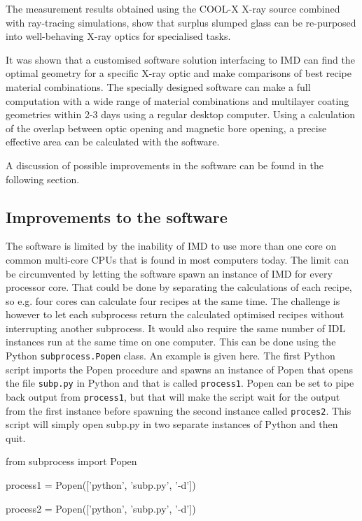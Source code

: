 The measurement results obtained using the COOL-X X-ray source combined with ray-tracing simulations, show that surplus slumped glass can be re-purposed into well-behaving X-ray optics for specialised tasks.

It was shown that a customised software solution interfacing to IMD can find the optimal geometry for a specific X-ray optic and make comparisons of best recipe material combinations. The specially designed software can make a full computation with a wide range of material combinations and multilayer coating geometries within 2-3 days using a regular desktop computer. Using a calculation of the overlap between optic opening and magnetic bore opening, a precise effective area can be calculated with the software.

A discussion of possible improvements in the software can be found in the following section.

\subsection{Improvements to the software}\label{sec:software_improvements}
The software is limited by the inability of IMD to use more than one core on common multi-core CPUs that is found in most computers today. The limit can be circumvented by letting the software spawn an instance of IMD for every processor core. That could be done by separating the calculations of each recipe, so e.g. four cores can calculate four recipes at the same time. The challenge is however to let each subprocess return the calculated optimised recipes without interrupting another subprocess. It would also require the same number of IDL instances run at the same time on one computer. This can be done using the Python \verb|subprocess.Popen| class. An example is given here. The first Python script imports the Popen procedure and spawns an instance of Popen that opens the file \verb|subp.py| in Python and that is called \verb|process1|. Popen can be set to pipe back output from \verb|process1|, but that will make the script wait for the output from the first instance before spawning the second instance called \verb|proces2|. This script will simply open subp.py in two separate instances of Python and then quit.

\begin{verbcode}
from subprocess import Popen

process1 = Popen(['python', 'subp.py', '-d'])

process2 = Popen(['python', 'subp.py', '-d'])
\end{verbcode}

